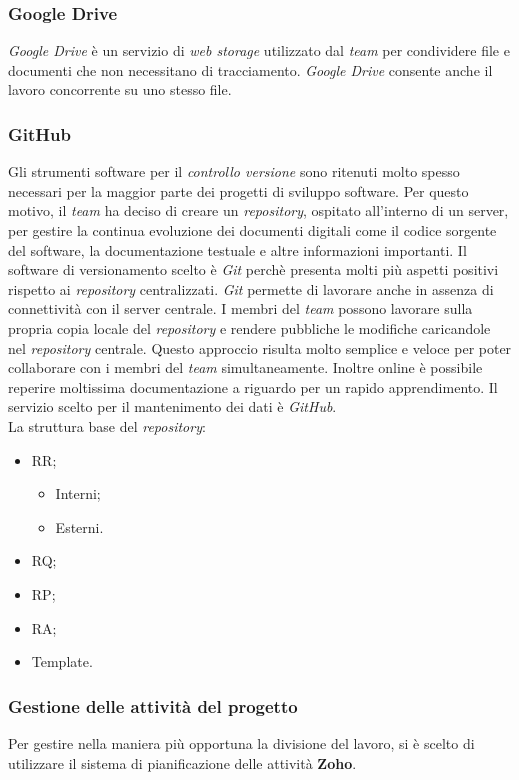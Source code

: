 \subsubsection{Google Drive}
\textit{Google Drive} è un servizio di \textit{web storage} utilizzato dal 
\textit{team} per condividere file e documenti che non necessitano di tracciamento. 
\textit{Google Drive} consente anche il lavoro concorrente su uno stesso 
file.
\subsubsection{GitHub}
Gli strumenti software per il \textit{controllo versione} sono ritenuti molto spesso necessari per la maggior parte dei progetti di sviluppo software.
Per questo motivo, il \textit{team} ha deciso di creare un \textit{repository}, ospitato all'interno di un server, per gestire la continua evoluzione dei documenti digitali come il codice sorgente del software, la documentazione testuale e altre informazioni importanti.
Il software di versionamento scelto è \textit{Git} perchè presenta molti più aspetti positivi rispetto ai \textit{repository} centralizzati. \textit{Git} permette di lavorare anche in assenza di connettività con il server centrale. I membri del \textit{team} possono lavorare sulla propria copia locale del \textit{repository} e rendere pubbliche le modifiche caricandole nel \textit{repository} centrale. Questo approccio risulta molto semplice e veloce per poter collaborare con i membri del \textit{team} simultaneamente.
Inoltre online è possibile reperire moltissima documentazione a riguardo per un rapido apprendimento. Il servizio
scelto per il mantenimento dei dati è \textit{GitHub}. \\La struttura base del \textit{repository}:
\begin{itemize}
  \item
	RR;
	\begin{itemize}
		\item
			Interni;
		\item
			Esterni.
	\end{itemize}
  \item
    RQ;
  \item
    RP;
  \item
  	RA;
  \item
  	Template. 
\end{itemize} 

\subsubsection{Gestione delle attività del progetto}
Per gestire nella maniera più opportuna la divisione del lavoro, si è scelto di 
utilizzare il sistema di pianificazione delle attività \textbf{Zoho}.

